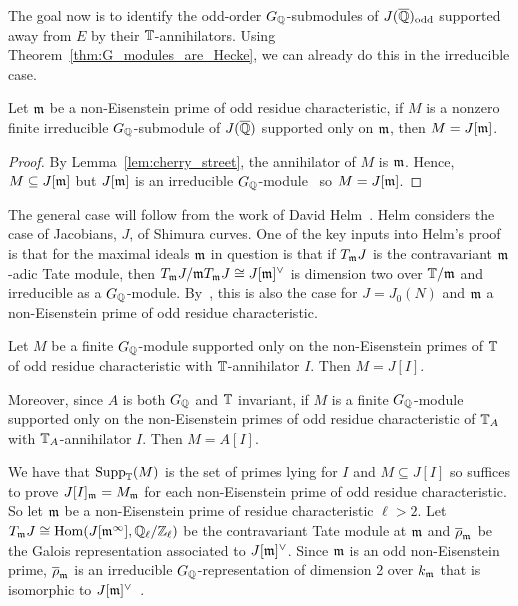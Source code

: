 \documentclass[11pt, proquest]{uwthesis}
\begin{document}
The goal now is to identify the odd-order $G_{\mathbb{Q}}$-submodules of
$J(\overline{\mathbb{Q}})_{\mathrm{odd}}$ supported away from $E$ by their $\mathbb{T}$-annihilators. Using
Theorem~\ref{thm:G_modules_are_Hecke}, we can already do this in the
irreducible case.
\begin{corollary}
    Let $\mathfrak{m}$ be a non-Eisenstein prime of odd residue characteristic, if $M$ is
    a nonzero finite irreducible $G_{\mathbb{Q}}$-submodule of $J(\overline{\mathbb{Q}})$ supported
    only on $\mathfrak{m}$, then $M=J[\mathfrak{m}]$.
\end{corollary}
\begin{proof}
    By Lemma~\ref{lem:cherry_street}, the annihilator of $M$ is $\mathfrak{m}$. Hence,
    $M\subseteq J[\mathfrak{m}]$ but $J[\mathfrak{m}]$ is an irreducible
    $G_{\mathbb{Q}}$-module~\cite[Proposition 14.2]{mazur:eisenstein} so $M=J[\mathfrak{m}]$.
\end{proof}

The general case will follow from the work of David Helm~\cite{helm:jacobian}.
Helm considers the case of Jacobians, $J$, of Shimura curves. One of the key
inputs into Helm's proof is that for the maximal ideals $\mathfrak{m}$ in question is
that if $T_{\mathfrak{m}} J$ is the contravariant $\mathfrak{m}$-adic Tate module, then $T_{\mathfrak{m}} J/\mathfrak{m}
T_{\mathfrak{m}} J\cong J[\mathfrak{m}]^\vee$ is dimension two over $\mathbb{T}/\mathfrak{m}$ and irreducible as a
$G_{\mathbb{Q}}$-module. By~\cite[Prop. 14.2]{mazur:eisenstein}, this is also the case
for $J=J_0(N)$ and $\mathfrak{m}$ a non-Eisenstein prime of odd residue characteristic.

\begin{theorem}%
    \label{thm:non_eisenstein_kernel_hecke}
    Let $M$ be a finite $G_{\mathbb{Q}}$-module supported only on the non-Eisenstein
    primes of $\mathbb{T}$ of odd residue characteristic with $\mathbb{T}$-annihilator $I$.
    Then $M=J[I]$.

    Moreover, since $A$ is both $G_{\mathbb{Q}}$ and $\mathbb{T}$ invariant, if $M$ is a finite
    $G_{\mathbb{Q}}$-module supported only on the non-Eisenstein primes of odd residue
    characteristic of $\mathbb{T}_A$ with $\mathbb{T}_A$-annihilator $I$. Then $M=A[I]$.
\end{theorem}

We have that $\operatorname{Supp}_{\mathbb{T}}(M)$ is the set of primes lying for $I$ and $M\subseteq
J[I]$ so suffices to prove $J[I]_{\mathfrak{m}} = M_{\mathfrak{m}}$ for each non-Eisenstein prime of
odd residue characteristic. So let $\mathfrak{m}$ be a non-Eisenstein prime of residue
characteristic $\ell>2$. Let $T_{\mathfrak{m}} J\cong \operatorname{Hom}(J[\mathfrak{m}^\infty],
\mathbb{Q}_\ell/\mathbb{Z}_\ell)$ be the contravariant Tate module at $\mathfrak{m}$ and
$\overline{\rho}_{\mathfrak{m}}$ be the Galois representation associated to $J[\mathfrak{m}]^\vee$.
Since $\mathfrak{m}$ is an odd non-Eisenstein prime, $\overline{\rho}_{\mathfrak{m}}$ is an
irreducible $G_{\mathbb{Q}}$-representation of dimension 2 over $k_{\mathfrak{m}}$ that is
isomorphic to $J[\mathfrak{m}]^\vee$~\cite[Prop. 14.2]{mazur:eisenstein}.
\end{document}
